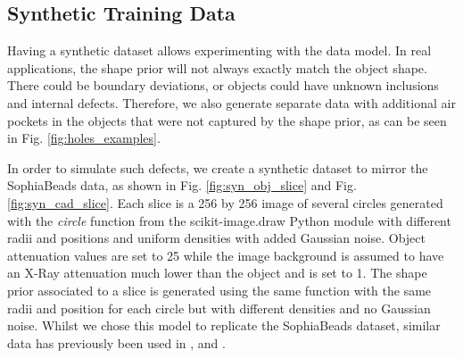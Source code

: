 \documentclass[../main.tex]{subfiles}
\begin{document}
\subsection{Synthetic Training Data}
\label{synthetic_training_data}

Having a synthetic dataset allows experimenting with the data model. In real applications, the shape prior will not always exactly match the object shape. There could be boundary deviations, or objects could have unknown inclusions and internal defects. Therefore, we also generate separate data with additional air pockets in the objects that were not captured by the shape prior, as can be seen in Fig. \ref{fig:holes_examples}. 

In order to simulate such defects, we create a synthetic dataset to mirror the SophiaBeads data, as shown in Fig. \ref{fig:syn_obj_slice} and Fig. \ref{fig:syn_cad_slice}. Each slice is a 256 by 256 image of several circles generated with the \textit{circle} function from the scikit-image.draw Python \cite{van2014scikit} module with different radii and positions and uniform densities with added Gaussian noise. Object attenuation values are set to 25 while the image background is assumed to have an X-Ray attenuation much lower than the object and is set to 1. The shape prior associated to a slice is generated using the same function with the same radii and position for each circle but with different densities and no Gaussian noise. Whilst we chose this model to replicate the SophiaBeads dataset, similar data has previously been used in \cite{jin2017deep}, \cite{adler2017solving} and \cite{kelly2017deep}.
\end{document}
